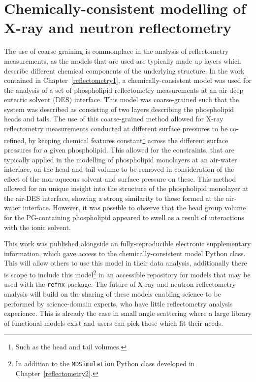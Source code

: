 \section{Chemically-consistent modelling of X-ray and neutron reflectometry}
The use of coarse-graining is commonplace in the analysis of reflectometry measurements, as the models that are used are typically made up layers which describe different chemical components of the underlying structure.
In the work contained in Chapter~\ref{reflectometry1}, a chemically-consistent model was used for the analysis of a set of phospholipid reflectometry measurements at an air-deep eutectic solvent (DES) interface.
This model was coarse-grained such that the system was described as consisting of two layers describing the phospholipid heads and tails.
The use of this coarse-grained method allowed for X-ray reflectometry measurements conducted at different surface pressures to be co-refined, by keeping chemical features constant\footnote{Such as the head and tail volumes.} across the different surface pressures for a given phospholipid.
This allowed for the constraints, that are typically applied in the modelling of phospholipid monolayers at an air-water interface, on the head and tail volume to be removed in consideration of the effect of the non-aqueous solvent and surface pressure on these.
This method allowed for an unique insight into the structure of the phospholipid monolayer at the air-DES interface, showing a strong similarity to those formed at the air-water interface.
However, it was possible to observe that the head group volume for the PG-containing phospholipid appeared to swell as a result of interactions with the ionic solvent.

This work was published alongside an fully-reproducible electronic supplementary information,\autocite{mccluskey_bayesian_2019,mccluskey_lipids_at_airdes_2019} which gave access to the chemically-consistent model Python class.
This will allow others to use this model in their data analysis, additionally there is scope to include this model\footnote{In addition to the \texttt{MDSimulation} Python class developed in Chapter~\ref{reflectometry2}.} in an accessible repository for models that may be used with the \texttt{refnx} package.\autocite{nelson_refnx_2019,nelson_refnx_2019-1,nelson_refnx-models_nodate}
The future of X-ray and neutron reflectometry analysis will build on the sharing of these models enabling science to be performed by science-domain experts, who have little reflectometry analysis experience.
This is already the case in small angle scattering where a large library of functional models exist and users can pick those which fit their needs.\autocite{noauthor_sasfit_nodate,noauthor_sasview_nodate}

